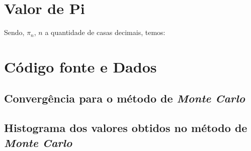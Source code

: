 \begin{appendixenv}[Apêndices]
    \section{Valor de Pi} \label{apx:pi-number}

    Sendo, $\pi_n$, $n$ a quantidade de casas decimais, temos:

    

    \cleardoublepage
    \section{Código fonte e Dados} \label{apx:source-code}

    \subsection{Convergência para o método de \textit{Monte Carlo}}
    \label{sec:convergence_coding_at_monte_carlo}
    
    
    
    \newpage
    
    \subsection{Histograma dos valores obtidos no método de \textit{Monte Carlo}}
    \label{sec:histogram_coding_at_monte_carlo}
    
    
    
    \newpage
    
\end{appendixenv}